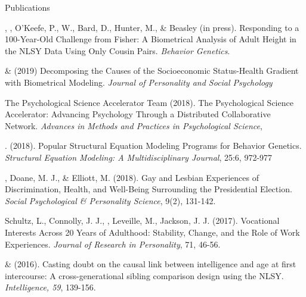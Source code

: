 \begin{rSection}{\textrm{Publications}}%
\begin{etaremune}
\item\Joe, \meb, O'Keefe, P., W., Bard, D., Hunter, M., \& Beasley (in press). Responding to a 100-Year-Old Challenge from Fisher: A Biometrical Analysis of Adult Height in the NLSY Data Using Only Cousin Pairs.  \textit{Behavior Genetics}.
\item \meb \& \joe (2019) Decomposing the Causes of the Socioeconomic Status-Health Gradient with Biometrical Modeling. \textit{Journal of Personality and Social Psychology} \href{https://osf.io/vd2kc/}{\small\color{blue}{osf.io/vd2kc/}}
\item The Psychological Science Accelerator Team (2018). The Psychological Science Accelerator: Advancing Psychology Through a Distributed Collaborative Network. \textit{Advances in Methods and Practices in Psychological Science}, \href{https://psyarxiv.com/785qu/}{\small\color{blue}{psyarxiv.com/\allowbreak 785qu/}}
\item \meb. (2018). Popular Structural Equation Modeling Programs for Behavior Genetics. \textit{Structural Equation Modeling: A Multidisciplinary Journal}, 25:6, 972-977 \href{https://www.tandfonline.com/doi/abs/10.1080/10705511.2018.1493385}{\small\color{blue}{doi:\allowbreak 10.1080/10705511.2018.1493385}}
\item\meb, Doane, M. J., \& Elliott, M. (2018). Gay and Lesbian Experiences of Discrimination, Health, and Well-Being Surrounding the Presidential Election. \textit{Social Psychological \& Personality Science}, 9(2), 131-142. \href{https://dx.doi.org/10.17605/OSF.IO/DWSCM}{\small\color{blue}{osf.io/dwscm/}}
\item Schultz, L., Connolly, J. J., \meb, Leveille, M., Jackson, J. J. (2017). Vocational Interests Across 20 Years of Adulthood: Stability, Change, and the Role of Work Experiences. \textit{Journal of Research in Personality}, 71, 46-56.
\item\meb \& \Joe (2016). Casting doubt on the causal link between intelligence and age at first intercourse: A cross-generational sibling comparison design using the NLSY. \textit{Intelligence, 59}, 139-156. \href{http://www.sciencedirect.com/science/article/pii/S0160289616300162}{\small\color{blue}{doi:10.1016/\allowbreak j.intell.2016.08.008}}

\end{etaremune}
\end{rSection}
